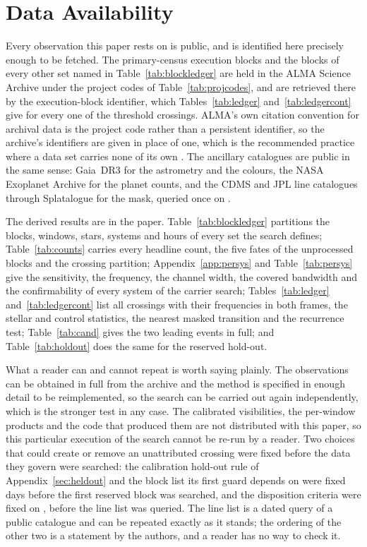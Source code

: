 \section*{Data Availability}
\label{sec:data}
Every observation this paper rests on is public, and is identified here
precisely enough to be fetched. The \NEB{} primary-census execution blocks and
the blocks of every other set named in Table~\ref{tab:blockledger} are held in
the ALMA Science Archive under the \NProjCodes{} project codes of
Table~\ref{tab:projcodes}, and are retrieved there by the execution-block
identifier, which Tables~\ref{tab:ledger} and~\ref{tab:ledgercont} give for
every one of the \EvNCrossRaw{} threshold crossings. ALMA's own citation
convention for archival data is the project code rather than a persistent
identifier, so the archive's identifiers are given in place of one, which is
the recommended practice where a data set carries none of its own
\citep{Chen2022}. The
ancillary catalogues are public in the same sense: Gaia~DR3 for the astrometry
and the colours, the NASA Exoplanet Archive for the planet counts, and the
CDMS and JPL line catalogues through Splatalogue for the mask, queried once on
\McQueryDate.

The derived results are in the paper. Table~\ref{tab:blockledger} partitions
the blocks, windows, stars, systems and hours of every set the search defines;
Table~\ref{tab:counts} carries every headline count, the five fates of the
unprocessed blocks and the crossing partition; Appendix~\ref{app:persys} and
Table~\ref{tab:persys} give the sensitivity, the frequency, the channel
width, the covered bandwidth and the confirmability of every system of the
carrier search;
Tables~\ref{tab:ledger} and~\ref{tab:ledgercont} list all \EvNCrossRaw{}
crossings with their frequencies in both frames, the stellar and control
statistics, the nearest masked transition and the recurrence test;
Table~\ref{tab:cand} gives the two leading events in full; and
Table~\ref{tab:holdout} does the same for the reserved hold-out.

What a reader can and cannot repeat is worth saying plainly. The observations
can be obtained in full from the archive and the method is specified in enough
detail to be reimplemented, so the search can be carried out again
independently, which is the stronger test in any case. The calibrated
visibilities, the per-window products and the code that produced them are not
distributed with this paper, so this particular execution of the search cannot
be re-run by a reader. Two choices that could create or remove an unattributed
crossing were fixed before the data they govern were searched: the calibration
hold-out rule of Appendix~\ref{sec:heldout} and the block list its first guard
depends on were fixed \HoLeadBlockDays{} days before the first reserved block
was searched, and the disposition criteria were fixed on \MkCritDate, before
the line list was queried. The line list is a dated query of a public
catalogue and can be repeated exactly as it stands; the ordering of the other
two is a statement by the authors, and a reader has no way to check it.

